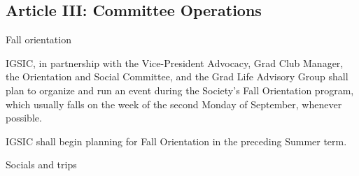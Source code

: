 \subsection{Article III: Committee Operations}
\begin{longenum}[ label*=\thesubsection.\arabic*., align=left] 
\item Fall orientation
	\begin{longenum}[ label*=\arabic*., align=left]
	\item IGSIC, in partnership with the Vice-President Advocacy, Grad Club Manager, the Orientation and Social Committee, and the Grad Life Advisory Group shall plan to organize and run an event during the Society’s Fall Orientation program, which usually falls on the week of the second Monday of September, whenever possible.
	\item IGSIC shall begin planning for Fall Orientation in the preceding Summer term.
	\end{longenum}
\item Socials and trips
	\begin{longenum}[ label*=\arabic*., align=left]

\end{longenum}
\end{longenum}
